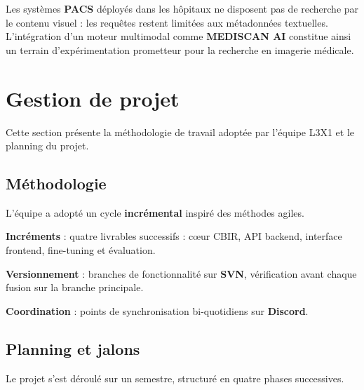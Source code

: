 \documentclass[12pt,a4paper]{article}
\newcommand{\NewMajorPart}{\clearpage}
\begin{document}
Les systèmes \textbf{PACS} déployés dans les hôpitaux ne disposent pas de recherche
par le contenu visuel : les requêtes restent limitées aux métadonnées textuelles.
L'intégration d'un moteur multimodal comme \textbf{MEDISCAN AI} constitue ainsi un
terrain d'expérimentation prometteur pour la recherche en imagerie médicale.

\NewMajorPart
\section{Gestion de projet}

Cette section présente la méthodologie de travail adoptée par l'équipe L3X1
et le planning du projet.

\vspace{0.4cm}

\subsection{Méthodologie}

\vspace{0.2cm}
L'équipe a adopté un cycle \textbf{incrémental} inspiré des méthodes agiles.

\vspace{0.2cm}
\begin{sq}
  \item \textbf{Incréments} : quatre livrables successifs : cœur CBIR, API backend,
        interface frontend, fine-tuning et évaluation.
  \item \textbf{Versionnement} : branches de fonctionnalité sur \textbf{SVN},
        vérification avant chaque fusion sur la branche principale.
  \item \textbf{Coordination} : points de synchronisation bi-quotidiens sur \textbf{Discord}.
\end{sq}

\vspace{0.7cm}

\subsection{Planning et jalons}

\vspace{0.2cm}
Le projet s'est déroulé sur un semestre, structuré en quatre phases successives.
\end{document}
